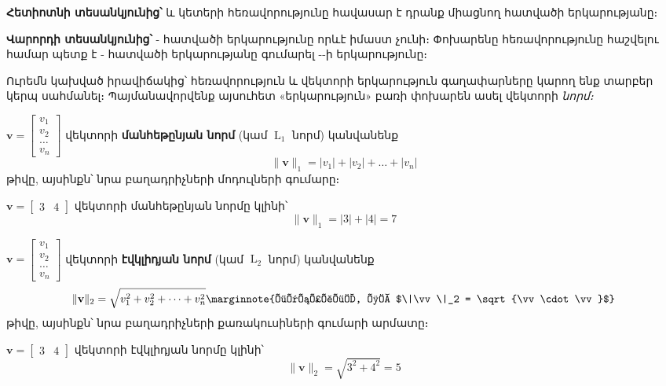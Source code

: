 \textbf{Հետիոտնի տեսանկյունից՝}  և  կետերի հեռավորությունը հավասար է դրանք միացնող հատվածի երկարությանը։

\textbf{Վարորդի տեսանկյունից՝} - հատվածի երկարությունը որևէ իմաստ չունի։ Փոխարենը հեռավորությունը հաշվելու համար պետք է - հատվածի երկարությանը գումարել --ի երկարությունը։



Ուրեմն կախված իրավիճակից՝ հեռավորություն և վեկտորի երկարու\-թյուն գաղափարները կարող ենք տարբեր կերպ սահմանել։ Պայ\-մա\-նա\-վորվենք այսուհետ «երկարություն» բառի փոխարեն ասել վեկտորի \textit{նորմ։}

\begin{definition}
$\mathbf{v} = \begin{bmatrix} v_1 \\ v_2 \\ \dots \\ v_n \end{bmatrix}$ վեկտորի \textbf{մանհեթընյան նորմ} (կամ $\operatorname{L}_1$ նորմ) կանվանենք
\[ \|\mathbf{v}\|_1 = |v_1| + |v_2| + \dots + |v_n| \]
թիվը, այսինքն՝ նրա բաղադրիչների մոդուլների գումարը։
\end{definition}

\begin{example}
$\mathbf{v} = \begin{bmatrix} 3 & 4 \end{bmatrix}$ վեկտորի մանհեթընյան նորմը կլինի՝
\[ \|\mathbf{v}\|_1 = |3| + |4| = 7 \]
\end{example}

\newpage 

\begin{definition}
$\mathbf{v} = \begin{bmatrix} v_1 \\ v_2 \\ \dots \\ v_n \end{bmatrix}$ վեկտորի \textbf{էվկլիդյան նորմ} (կամ $\operatorname{L}_2$ նորմ) կանվանենք
\[ \|\mathbf{v}\|_2 = \sqrt{v_1^2 +v_2^2+\dots+ v_n^2}\marginnote{նկատենք, որ $\|\vv\|_2 = \sqrt{\vv \cdot \vv}$} \]
թիվը, այսինքն՝ նրա բաղադրիչների քառակուսիների գումարի արմատը։
\end{definition}

\begin{example}
$\mathbf{v} = \begin{bmatrix} 3 & 4 \end{bmatrix}$ վեկտորի էվկլիդյան նորմը կլինի՝
\[ \|\mathbf{v}\|_2 = \sqrt{3^2 + 4^2} = 5 \]
\end{example}

